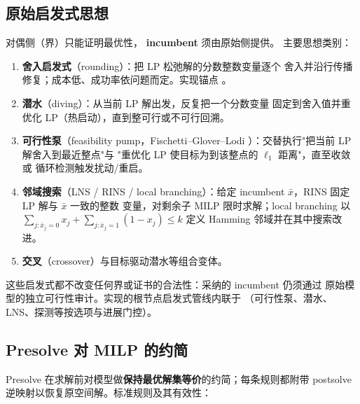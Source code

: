 \subsection{原始启发式思想}
\label{subsec:primal-heuristics}

对偶侧（界）只能证明最优性，\textbf{ incumbent} 须由原始侧提供。
主要思想类别：

\begin{enumerate}
  \item \textbf{舍入启发式}（rounding）：把 LP 松弛解的分数整数变量逐个
        舍入并沿行传播修复；成本低、成功率依问题而定。实现锚点
        。
  \item \textbf{潜水}（diving）：从当前 LP 解出发，反复把一个分数变量
        固定到舍入值并重优化 LP（热启动），直到整可行或不可行回溯。
  \item \textbf{可行性泵}（feasibility pump，Fischetti--Glover--Lodi
        \cite{fischetti2005}）：交替执行"把当前 LP 解舍入到最近整点"与
        "重优化 LP 使目标为到该整点的 $\ell_1$ 距离"，直至收敛或
        循环检测触发扰动/重启。
  \item \textbf{邻域搜索}（LNS / RINS / local branching）：给定 incumbent
        $\bar x$，RINS \cite{danna2005} 固定 LP 解与 $\bar x$ 一致的整数
        变量，对剩余子 MILP 限时求解；local branching 以
        $\sum_{j: \bar x_j = 0} x_j + \sum_{j: \bar x_j = 1}(1-x_j) \le k$
        定义 Hamming 邻域并在其中搜索改进。
  \item \textbf{交叉}（crossover）与目标驱动潜水等组合变体。
\end{enumerate}

这些启发式都不改变任何界或证书的合法性：采纳的 incumbent 仍须通过
原始模型的独立可行性审计。实现的根节点启发式管线内联于
（可行性泵、潜水、LNS、探测等按选项与进展门控）。

\subsection{Presolve 对 MILP 的约简}
\label{subsec:milp-presolve}

Presolve 在求解前对模型做\textbf{保持最优解集等价}的约简；每条规则都附带
postsolve 逆映射以恢复原空间解。标准规则及其有效性：

